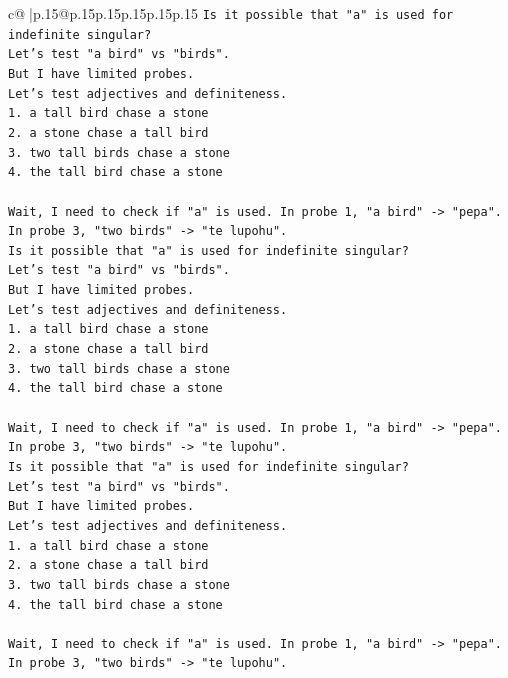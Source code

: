 \documentclass{article}
\begin{document}
{\begin{supertabular}{c@{$\;$}|p{.15\linewidth}@{}p{.15\linewidth}p{.15\linewidth}p{.15\linewidth}p{.15\linewidth}p{.15\linewidth}}
{{{\texttt{Is it possible that "a" is used for indefinite singular?} \\
\texttt{Let's test "a bird" vs "birds".} \\
\texttt{But I have limited probes.} \\
\texttt{Let's test adjectives and definiteness.} \\
\texttt{1. a tall bird chase a stone} \\
\texttt{2. a stone chase a tall bird} \\
\texttt{3. two tall birds chase a stone} \\
\texttt{4. the tall bird chase a stone} \\
\\ 
\texttt{Wait, I need to check if "a" is used. In probe 1, "a bird" {-}> "pepa". In probe 3, "two birds" {-}> "te lupohu".} \\
\texttt{Is it possible that "a" is used for indefinite singular?} \\
\texttt{Let's test "a bird" vs "birds".} \\
\texttt{But I have limited probes.} \\
\texttt{Let's test adjectives and definiteness.} \\
\texttt{1. a tall bird chase a stone} \\
\texttt{2. a stone chase a tall bird} \\
\texttt{3. two tall birds chase a stone} \\
\texttt{4. the tall bird chase a stone} \\
\\ 
\texttt{Wait, I need to check if "a" is used. In probe 1, "a bird" {-}> "pepa". In probe 3, "two birds" {-}> "te lupohu".} \\
\texttt{Is it possible that "a" is used for indefinite singular?} \\
\texttt{Let's test "a bird" vs "birds".} \\
\texttt{But I have limited probes.} \\
\texttt{Let's test adjectives and definiteness.} \\
\texttt{1. a tall bird chase a stone} \\
\texttt{2. a stone chase a tall bird} \\
\texttt{3. two tall birds chase a stone} \\
\texttt{4. the tall bird chase a stone} \\
\\ 
\texttt{Wait, I need to check if "a" is used. In probe 1, "a bird" {-}> "pepa". In probe 3, "two birds" {-}> "te lupohu".} \\
}}}
\end{supertabular}}
\end{document}

